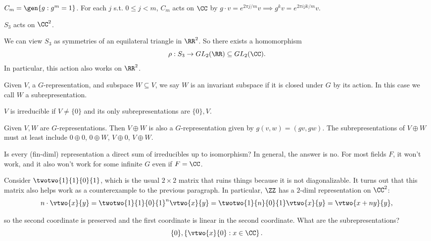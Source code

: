 \begin{example}
\exlabel

$C_m = \gen{g : g^m=1}$. For each $j$ s.t. $0\leq j < m$, $C_m$ acts on $\CC$ by $g\cdot v = e^{2\pi j/m}v\implies g^kv = e^{2\pi ijk/m}v$. 
\end{example}

\begin{example}
\exlabel

$S_3$ acts on $\CC^2$. 
\end{example}

We can view $S_3$ as symmetries of an equilateral triangle in $\RR^2$. So there exists a homomorphism
\[\rho : S_3\rightarrow GL_2(\RR)\subseteq GL_2(\CC).\]
In particular, this action also works on $\RR^2$.

\begin{definition}

Given $V$, a $G$-representation, and subspace $W\subseteq V$, we say $W$ is an \ac{invariant subspace} if it is closed under $G$ by its action. In this case we call $W$ a subrepresentation.
\end{definition}

\begin{definition}

$V$ is \ac{irreducible} if $V\neq \{0\}$ and its only subrepresentations are $\{0\},V$. 
\end{definition}

Given $V,W$ are $G$-representations. Then $V\oplus W$ is also a $G$-representation given by $g(v,w) = (gv, gw)$. The subrepresentations of $V\oplus W$ must at least include $0\oplus 0$, $0\oplus W$, $V\oplus 0$, $V\oplus W$. 

Is every (fin-diml) representation a direct sum of irreducibles up to isomorphism? In general, the answer is no. For most fields $F$, it won't work, and it also won't work for some infinite $G$ even if $F = \CC$. 

Consider $\twotwo{1}{1}{0}{1}$, which is the usual $2\times 2$ matrix that ruins things because it is not diagonalizable. It turns out that this matrix also helps work as a counterexample to the previous paragraph. In particular, $\ZZ$ has a $2$-diml representation on $\CC^2$:
\[n\cdot \vtwo{x}{y} = \twotwo{1}{1}{0}{1}^n \vtwo{x}{y} = \twotwo{1}{n}{0}{1} \vtwo{x}{y} = \vtwo{x+ny}{y},\]

so the second coordinate is preserved and the first coordinate is linear in the second coordinate. What are the subrepresentations? 
\[\{0\}, \left\{\vtwo{x}{0} : x\in \CC\right\}.\] 

